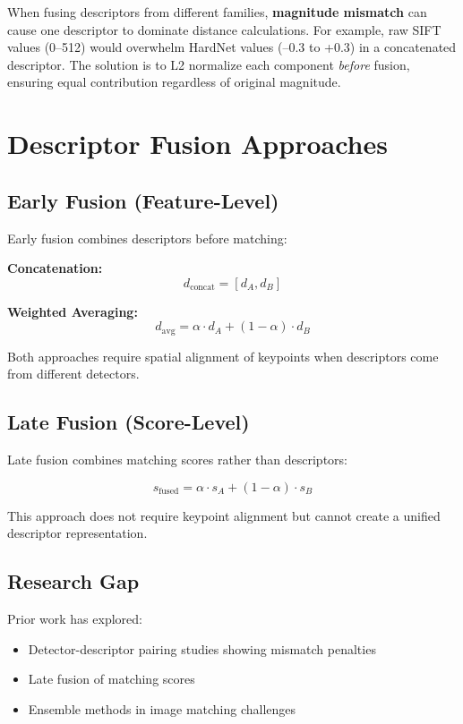 When fusing descriptors from different families, \textbf{magnitude mismatch} can cause one descriptor to dominate distance calculations. For example, raw SIFT values (0--512) would overwhelm HardNet values (--0.3 to +0.3) in a concatenated descriptor. The solution is to L2 normalize each component \textit{before} fusion, ensuring equal contribution regardless of original magnitude.

\section{Descriptor Fusion Approaches}

\subsection{Early Fusion (Feature-Level)}

Early fusion combines descriptors before matching:

\textbf{Concatenation:}
\begin{equation}
    d_{\text{concat}} = [d_A, d_B]
\end{equation}

\textbf{Weighted Averaging:}
\begin{equation}
    d_{\text{avg}} = \alpha \cdot d_A + (1 - \alpha) \cdot d_B
\end{equation}

Both approaches require spatial alignment of keypoints when descriptors come from different detectors.

\subsection{Late Fusion (Score-Level)}

Late fusion combines matching scores rather than descriptors:

\begin{equation}
    s_{\text{fused}} = \alpha \cdot s_A + (1 - \alpha) \cdot s_B
\end{equation}

This approach does not require keypoint alignment but cannot create a unified descriptor representation.

\subsection{Research Gap}

Prior work has explored:
\begin{itemize}
    \item Detector-descriptor pairing studies showing mismatch penalties~\cite{mikolajczyk2005comparison,ma2021local}
    \item Late fusion of matching scores
    \item Ensemble methods in image matching challenges
\end{itemize}

